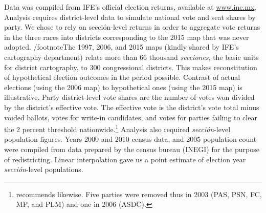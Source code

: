 \documentclass[letter,12pt]{article}
\begin{document}
Data was compiled from IFE's official election returns, available at \url{www.ine.mx}. Analysis requires district-level data to simulate national vote and seat shares by party. We chose to rely on secci\'on-level returns in order to aggregate vote returns in the three races into districts corresponding to the 2015 map that was never adopted. /footnote{The 1997, 2006, and 2015 maps (kindly shared by IFE's cartography department) relate more than 66 thousand \emph{secciones}, the basic units for district cartography, to 300 congressional districts. This makes reconstitution of hypothetical election outcomes in the period possible.} Contrast of actual elections (using the 2006 map) to hypothetical ones (using the 2015 map) is illustrative. Party district-level vote shares are the number of votes won divided by the district's effective vote. The effective vote is the district's vote total minus voided ballots, votes for write-in candidates, and votes for parties failing to clear the 2 percent threshold nationwide.\footnote{\citet[][:fn. 4]{linzerSeatVoteElasticity2012} recommends likewise. Five parties were removed thus in 2003 (PAS, PSN, FC, MP, and PLM) and one in 2006 (ASDC).} Analysis also required \emph{secci\'on}-level population figures. Years 2000 and 2010 census data, and 2005 population count were compiled from data prepared by the census bureau (INEGI) for the purpose of redistricting. Linear interpolation gave us a point estimate of election year \emph{secci\'on}-level populations. 
\end{document}
